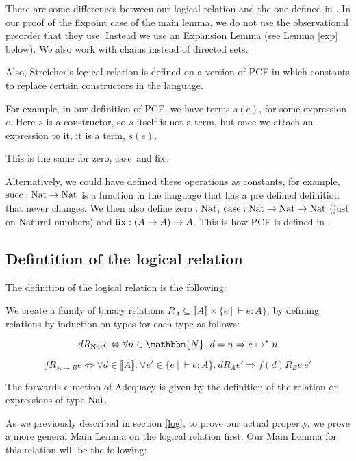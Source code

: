 There are some differences between our logical relation and the one defined in \citep{Streicher06}. In our proof of the fixpoint case of the main lemma, we do not use the observational preorder that they use. Instead we use an Expansion Lemma (see Lemma \ref{exp} below). We also work with chains instead of directed sets.

Also, Streicher's logical relation is defined on a version of PCF in which  constants to replace certain constructors in the language.

For example, in our definition of PCF, we have terms $s(e)$, for some expression $e$. Here $s$ is a constructor, so $s$ itself is not a term, but once we attach an expression to it, it is a term, $s(e)$.

This is the same for zero, $\operatorname{case}$ and $\operatorname{fix}$.

Alternatively, we could have defined these operations as constants, for example, $\operatorname{succ} : \operatorname{Nat} \to \operatorname{Nat}$ is a function in the language that has a pre defined definition that never changes. We then also define zero $: \operatorname{Nat}$, $\operatorname{case} : \operatorname{Nat} \to \operatorname{Nat} \to \operatorname{Nat}$ (just on Natural numbers) and $\operatorname{fix} : (A \to A) \to A$. This is how PCF is defined in \citep{Streicher06}.
 
\subsection{Defintition of the logical relation}
The definition of the logical relation is the following:

\vspace{0.5cm}

\begin{defn}
We create a family of binary  relations $R_A \subseteq \llbracket A \rrbracket \times \{e \ | \ \vdash e : A \}$, by defining relations by induction on types for each type as follows:

\[ d  R_{\nat}  e \Leftrightarrow \forall n \in \mathbbm{N}. \ d = n \Rightarrow e \mapsto^* n\]

\[f  R_{A \to B}  e \Leftrightarrow \forall d \in \llbracket A \rrbracket. \ \forall e' \in \{ e \ | \ \vdash e : A\}. \ d R_A e' \Rightarrow f(d) R_B  e \ e'\]

\end{defn}

The forwards direction of Adequacy is given by the definition of the relation on expressions of type $\operatorname{Nat}$.

As we previously described in section \ref{log}, to prove our actual property, we prove a more general Main Lemma on the logical relation first. Our Main Lemma for this relation will be the following:

